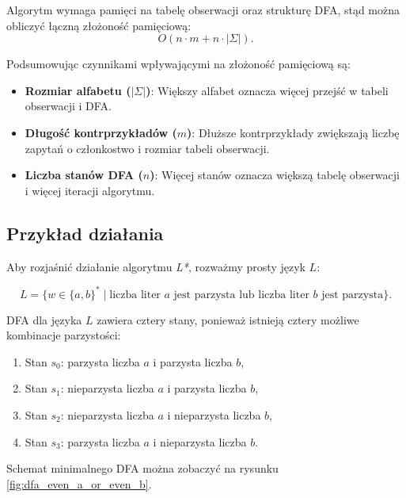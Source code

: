 Algorytm wymaga pamięci na tabelę obserwacji oraz strukturę DFA, stąd można obliczyć łączną złożoność pamięciową:
\[
O(n \cdot m + n \cdot |\Sigma|).
\]

Podsumowując czynnikami wpływającymi na złożoność pamięciową są:
\begin{itemize}
    \item \textbf{Rozmiar alfabetu (\(|\Sigma|\))}: Większy alfabet oznacza więcej przejść w tabeli obserwacji i DFA.
    \item \textbf{Długość kontrprzykładów (\(m\))}: Dłuższe kontrprzykłady zwiększają liczbę zapytań o członkostwo i rozmiar tabeli obserwacji.
    \item \textbf{Liczba stanów DFA (\(n\))}: Więcej stanów oznacza większą tabelę obserwacji i więcej iteracji algorytmu.
\end{itemize}

\subsection{Przykład działania}

Aby rozjaśnić działanie algorytmu \textit{L*}, rozważmy prosty język $L$:

\[
L = \{ w \in \{a, b\}^* \mid \text{liczba liter } a \text{ jest parzysta lub liczba liter } b \text{ jest parzysta} \}.
\]

DFA dla języka $L$ zawiera cztery stany, ponieważ istnieją cztery możliwe kombinacje parzystości:
\begin{enumerate}
    \item Stan $s_0$: parzysta liczba $a$ i parzysta liczba $b$,
    \item Stan $s_1$: nieparzysta liczba $a$ i parzysta liczba $b$,
    \item Stan $s_2$: nieparzysta liczba $a$ i nieparzysta liczba $b$,
    \item Stan $s_3$: parzysta liczba $a$ i nieparzysta liczba $b$.
\end{enumerate}

Schemat minimalnego DFA można zobaczyć na rysunku \ref{fig:dfa_even_a_or_even_b}.

